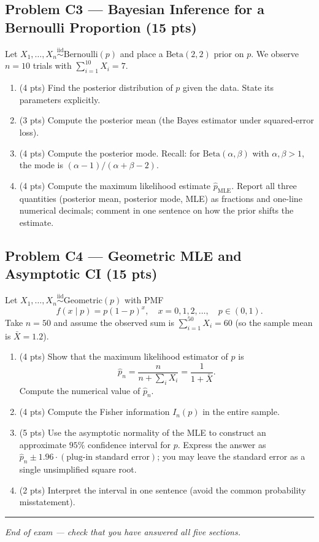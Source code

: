 \documentclass[11pt]{article}
\newcommand{\iid}{\stackrel{\text{iid}}{\sim}}
\begin{document}
\subsection*{Problem C3 --- Bayesian Inference for a Bernoulli Proportion (15 pts)}

Let $X_1, \dots, X_n \iid \text{Bernoulli}(p)$ and place a $\text{Beta}(2, 2)$ prior on $p$. We observe $n = 10$ trials with $\sum_{i=1}^{10} X_i = 7$.

\begin{enumerate}[label=(\alph*),leftmargin=2em]
    \item (4 pts) Find the posterior distribution of $p$ given the data. State its parameters explicitly.
    \item (3 pts) Compute the posterior mean (the Bayes estimator under squared-error loss).
    \item (4 pts) Compute the posterior mode. Recall: for $\text{Beta}(\alpha, \beta)$ with $\alpha, \beta > 1$, the mode is $(\alpha - 1)/(\alpha + \beta - 2)$.
    \item (4 pts) Compute the maximum likelihood estimate $\hat{p}_{\text{MLE}}$. Report all three quantities (posterior mean, posterior mode, MLE) as fractions and one-line numerical decimals; comment in one sentence on how the prior shifts the estimate.
\end{enumerate}

\subsection*{Problem C4 --- Geometric MLE and Asymptotic CI (15 pts)}

Let $X_1, \dots, X_n \iid \text{Geometric}(p)$ with PMF
\[
f(x \mid p) = p(1-p)^x, \quad x = 0, 1, 2, \dots, \quad p \in (0,1).
\]
Take $n = 50$ and assume the observed sum is $\sum_{i=1}^{50} X_i = 60$ (so the sample mean is $\bar{X} = 1.2$).

\begin{enumerate}[label=(\alph*),leftmargin=2em]
    \item (4 pts) Show that the maximum likelihood estimator of $p$ is
    \[
    \hat{p}_n = \frac{n}{n + \sum_i X_i} = \frac{1}{1 + \bar{X}}.
    \]
    Compute the numerical value of $\hat{p}_n$.
    \item (4 pts) Compute the Fisher information $I_n(p)$ in the entire sample.
    \item (5 pts) Use the asymptotic normality of the MLE to construct an approximate $95\%$ confidence interval for $p$. Express the answer as $\hat{p}_n \pm 1.96 \cdot (\text{plug-in standard error})$; you may leave the standard error as a single unsimplified square root.
    \item (2 pts) Interpret the interval in one sentence (avoid the common probability misstatement).
\end{enumerate}

\vspace{1em}
\hrule
\begin{center}
\textit{End of exam --- check that you have answered all five sections.}
\end{center}
\end{document}
